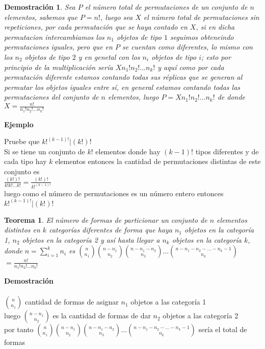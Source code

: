 \documentclass[a4paper,12pt]{report}
\newtheorem*{teo}{Teorema}
\newtheorem*{dem}{Demostración}
\begin{document}
\begin{dem}
    Sea $P$ el n\'umero total de permutaciones de un conjunto de $n$ elementos, sabemos que $P = n!$, luego sea $X$ el n\'umero total de permutaciones sin repeticiones, 
    por cada permutaci\'on que se haya contado en $X$, si en dicha permutacion intercambiamos los $n_1$ objetos de tipo $1$ seguimos obteneindo permutaciones iguales, pero que en $P$ se cuentan como diferentes, lo mismo 
    con los $n_2$ objetos de tipo $2$ y en genetal con los $n_i$ objetos de tipo $i$; esto por principio de la multiplicaci\'on ser\'ia $Xn_1!n_2!...n_k!$ y aqu\'i como por cada permutaci\'on diferente estamos contando todas sus r\'eplicas que se generan al permutar los objetos iguales entre s\'i, en general estamos contando todas las permutaciones del conjunto de $n$ elementos,
    luego $P = Xn_1!n_2!...n_k!$ de donde $X = \frac{n!}{n_1!n_2!...n_k!}$
\end{dem}


\textbf{Ejemplo}

Pruebe que $k!^{(k-1)!}|(k!)!$\\

Si se tiene un conjunto de $k!$ elementos donde hay $(k-1)!$ tipos diferentes y de cada tipo hay $k$ elementos entonces la cantidad de permutaciones distintas de este conjunto es\\

$\frac{(k!)!}{k!k!\dots k!}=\frac{(k!)!}{k!^{(k-1)!}}$ \\

luego como el número de permutaciones es un número entero entonces $k!^{(k-1)!}|(k!)!$


\begin{teo}
 El número de formas de particionar un conjunto de $n$ elementos distintos en $k$ categorías diferentes de forma que haya $n_1$ objetos en la categoría 1, $n_2$ objetos en la categoría 2 y así hasta llegar a $n_k$ objetos en la categoría $k$, donde $n = \sum^k_{i=1}n_i$ es  ${n}\choose{n_1}$${n-n_1}\choose{n_2}$${n-n_1-n_2}\choose{n_3}$$\dots$${n-n_1-n_2-\dots-n_k-1}\choose{n_k}$$=\frac{n!}{n_1!n_2!\dots n_k!}$
\end{teo}



\textbf{Demostración}\\\\
${n}\choose{n_1}$ cantidad de formas de asignar $n_1$ objetos a las categoría 1\\
luego ${n-n_1}\choose{n_2}$ es la cantidad de formas de dar $n_2$ objetos a las categoría 2\\
por tanto ${n}\choose{n_1}$${n-n_1}\choose{n_2}$${n-n_1-n_2}\choose{n_3}$$\dots$${n-n_1-n_2-\dots-n_k-1}\choose{n_k}$ sería el total de formas\\
\end{document}

